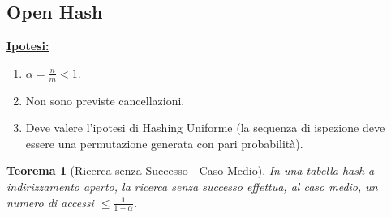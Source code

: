 \documentclass{article}
\newtheorem{theorem}{Teorema}[section]
\begin{document}
\subsection{Open Hash}

\textbf{\underline{Ipotesi:}}

\begin{enumerate}
    \item $\alpha = \frac{n}{m} < 1$.
    \item Non sono previste cancellazioni.
    \item Deve valere l'ipotesi di Hashing Uniforme (la sequenza di ispezione deve essere una permutazione generata con pari probabilità).
\end{enumerate}

\begin{theorem}[Ricerca senza Successo - Caso Medio]
    In una tabella hash a indirizzamento aperto, la ricerca senza successo effettua, al caso medio, un numero di accessi $\leq \frac{1}{1 - \alpha}$.
\end{theorem}
\end{document}
